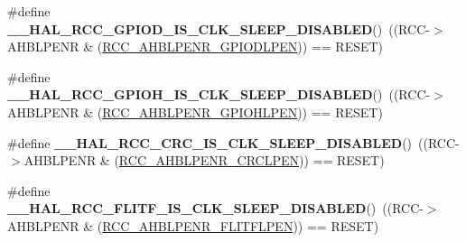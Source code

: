 \begin{DoxyCompactItemize}
\item 
\hypertarget{group___r_c_c___a_h_b___clock___sleep___enable___disable___status_gafdc54fb0d223358257ea5c9f2d9c2db6}{\#define {\bfseries \-\_\-\-\_\-\-H\-A\-L\-\_\-\-R\-C\-C\-\_\-\-G\-P\-I\-O\-D\-\_\-\-I\-S\-\_\-\-C\-L\-K\-\_\-\-S\-L\-E\-E\-P\-\_\-\-D\-I\-S\-A\-B\-L\-E\-D}()~((R\-C\-C-\/$>$A\-H\-B\-L\-P\-E\-N\-R \& (\hyperlink{group___peripheral___registers___bits___definition_ga25cad84f367cbe2ecdbea5a5b3f0d605}{R\-C\-C\-\_\-\-A\-H\-B\-L\-P\-E\-N\-R\-\_\-\-G\-P\-I\-O\-D\-L\-P\-E\-N})) == R\-E\-S\-E\-T)}\label{group___r_c_c___a_h_b___clock___sleep___enable___disable___status_gafdc54fb0d223358257ea5c9f2d9c2db6}

\item 
\hypertarget{group___r_c_c___a_h_b___clock___sleep___enable___disable___status_gae53e66bfd35d315af80f7d33a811de7c}{\#define {\bfseries \-\_\-\-\_\-\-H\-A\-L\-\_\-\-R\-C\-C\-\_\-\-G\-P\-I\-O\-H\-\_\-\-I\-S\-\_\-\-C\-L\-K\-\_\-\-S\-L\-E\-E\-P\-\_\-\-D\-I\-S\-A\-B\-L\-E\-D}()~((R\-C\-C-\/$>$A\-H\-B\-L\-P\-E\-N\-R \& (\hyperlink{group___peripheral___registers___bits___definition_ga13b804e2e8ae7920a8db3a1828ff3b42}{R\-C\-C\-\_\-\-A\-H\-B\-L\-P\-E\-N\-R\-\_\-\-G\-P\-I\-O\-H\-L\-P\-E\-N})) == R\-E\-S\-E\-T)}\label{group___r_c_c___a_h_b___clock___sleep___enable___disable___status_gae53e66bfd35d315af80f7d33a811de7c}

\item 
\hypertarget{group___r_c_c___a_h_b___clock___sleep___enable___disable___status_gacb97eeee02557f4c5a3afd480227dd1c}{\#define {\bfseries \-\_\-\-\_\-\-H\-A\-L\-\_\-\-R\-C\-C\-\_\-\-C\-R\-C\-\_\-\-I\-S\-\_\-\-C\-L\-K\-\_\-\-S\-L\-E\-E\-P\-\_\-\-D\-I\-S\-A\-B\-L\-E\-D}()~((R\-C\-C-\/$>$A\-H\-B\-L\-P\-E\-N\-R \& (\hyperlink{group___peripheral___registers___bits___definition_ga24b72821d1df0037ffad16d4e7aefc48}{R\-C\-C\-\_\-\-A\-H\-B\-L\-P\-E\-N\-R\-\_\-\-C\-R\-C\-L\-P\-E\-N})) == R\-E\-S\-E\-T)}\label{group___r_c_c___a_h_b___clock___sleep___enable___disable___status_gacb97eeee02557f4c5a3afd480227dd1c}

\item 
\hypertarget{group___r_c_c___a_h_b___clock___sleep___enable___disable___status_ga06858d9e8310f1d9d2763472d37e9d9c}{\#define {\bfseries \-\_\-\-\_\-\-H\-A\-L\-\_\-\-R\-C\-C\-\_\-\-F\-L\-I\-T\-F\-\_\-\-I\-S\-\_\-\-C\-L\-K\-\_\-\-S\-L\-E\-E\-P\-\_\-\-D\-I\-S\-A\-B\-L\-E\-D}()~((R\-C\-C-\/$>$A\-H\-B\-L\-P\-E\-N\-R \& (\hyperlink{group___peripheral___registers___bits___definition_ga216c6dc7dadf00b88d1b0585b68e23f0}{R\-C\-C\-\_\-\-A\-H\-B\-L\-P\-E\-N\-R\-\_\-\-F\-L\-I\-T\-F\-L\-P\-E\-N})) == R\-E\-S\-E\-T)}\label{group___r_c_c___a_h_b___clock___sleep___enable___disable___status_ga06858d9e8310f1d9d2763472d37e9d9c}


\end{DoxyCompactItemize}
